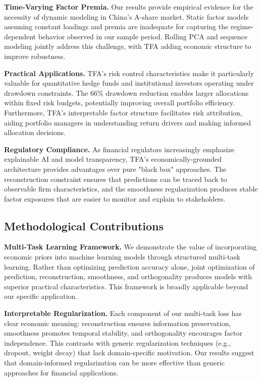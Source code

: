 \documentclass[12pt]{article}
\begin{document}
\textbf{Time-Varying Factor Premia.} Our results provide empirical evidence for the necessity of dynamic modeling in China's A-share market. Static factor models assuming constant loadings and premia are inadequate for capturing the regime-dependent behavior observed in our sample period. Rolling PCA and sequence modeling jointly address this challenge, with TFA adding economic structure to improve robustness.

\textbf{Practical Applications.} TFA's risk control characteristics make it particularly valuable for quantitative hedge funds and institutional investors operating under drawdown constraints. The 66\% drawdown reduction enables larger allocations within fixed risk budgets, potentially improving overall portfolio efficiency. Furthermore, TFA's interpretable factor structure facilitates risk attribution, aiding portfolio managers in understanding return drivers and making informed allocation decisions.

\textbf{Regulatory Compliance.} As financial regulators increasingly emphasize explainable AI and model transparency, TFA's economically-grounded architecture provides advantages over pure "black box" approaches. The reconstruction constraint ensures that predictions can be traced back to observable firm characteristics, and the smoothness regularization produces stable factor exposures that are easier to monitor and explain to stakeholders.

\subsection{Methodological Contributions}

\textbf{Multi-Task Learning Framework.} We demonstrate the value of incorporating economic priors into machine learning models through structured multi-task learning. Rather than optimizing prediction accuracy alone, joint optimization of prediction, reconstruction, smoothness, and orthogonality produces models with superior practical characteristics. This framework is broadly applicable beyond our specific application.

\textbf{Interpretable Regularization.} Each component of our multi-task loss has clear economic meaning: reconstruction ensures information preservation, smoothness promotes temporal stability, and orthogonality encourages factor independence. This contrasts with generic regularization techniques (e.g., dropout, weight decay) that lack domain-specific motivation. Our results suggest that domain-informed regularization can be more effective than generic approaches for financial applications.
\end{document}
